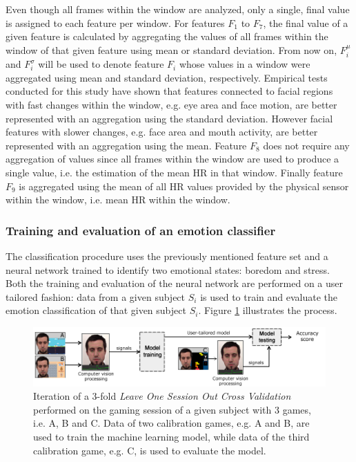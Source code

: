 Even though all frames within the window are analyzed, only a single, final value is assigned to each feature per window. For features $F_1$ to $F_7$, the final value of a given feature is calculated by aggregating the values of all frames within the window of that given feature using mean or standard deviation. From now on, $F_i^\mu$ and $F_i^\sigma$ will be used to denote feature $F_i$ whose values in a window were aggregated using mean and standard deviation, respectively. Empirical tests conducted for this study have shown that features connected to facial regions with fast changes within the window, e.g. eye area and face motion, are better represented with an aggregation using the standard deviation. However facial features with slower changes, e.g. face area and mouth activity, are better represented with an aggregation using the mean. Feature $F_8$ does not require any aggregation of values since all frames within the window are used to produce a single value, i.e. the estimation of the mean HR in that window. Finally feature $F_9$ is aggregated using the mean of all HR values provided by the physical sensor within the window, i.e. mean HR within the window.

\subsubsection{Training and evaluation of an emotion classifier}
\label{s:experiment1-study5-training-evaluation}

The classification procedure uses the previously mentioned feature set and a neural network trained to identify two emotional states: boredom and stress. Both the training and evaluation of the neural network are performed on a user tailored fashion: data from a given subject $S_i$ is used to train and evaluate the emotion classification of that given subject $S_i$. Figure \ref{fig:study5-training-evaluation} illustrates the process.

\begin{figure}[ht]
    \centering
    \includegraphics[width=\textwidth]{figures/machine-learning-investigation.png}
    \caption{Iteration of a 3-fold \textit{Leave One Session Out Cross Validation} performed on the gaming session of a given subject with 3 games, i.e. A, B and C. Data of two calibration games, e.g. A and B, are used to train the machine learning model, while data of the third calibration game, e.g. C, is used to evaluate the model.}
    \label{fig:study5-training-evaluation}
\end{figure}

